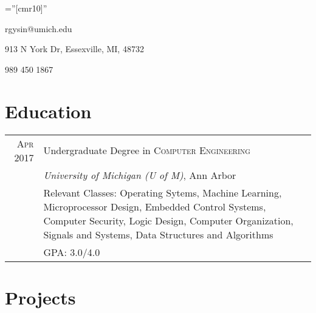 \documentclass[a4paper,10pt]{article} %
\newcommand\rightleftbox[1]{ \parbox{.30\textwidth}{#1} }
\newcommand\centerbox[1]{ \parbox{.40\textwidth}{#1} }
\begin{document}
\pagestyle{empty} %

\font\fb=''[cmr10]'' %


\par{\bigskip\par} %

\par{
\rightleftbox{rgysin@umich.edu\hfill}
\centerbox{913 N York Dr, Essexville, MI, 48732}
\rightleftbox{\hfill989 450 1867}
}


\section{Education}

\begin{tabular}{r|p{12cm}}
\hspace{4pt}\textsc{Apr} 2017& Undergraduate Degree in \textsc{Computer Engineering} \\
& \normalsize\emph{University of Michigan (U of M)}, Ann Arbor \\
& \footnotesize{Relevant Classes: Operating Sytems, Machine Learning,
  Microprocessor Design, Embedded Control Systems, Computer Security,
  Logic Design, Computer Organization, Signals and Systems,
  Data Structures and Algorithms}\\
& \footnotesize{GPA: 3.0/4.0} \\
\end{tabular}


\section{Projects}
\end{document}

